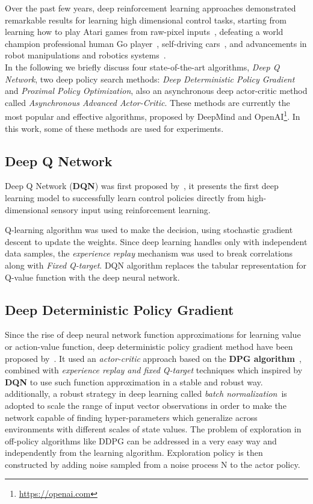 Over the past few years, deep reinforcement learning approaches demonstrated remarkable results for learning high dimensional control tasks, starting from learning how to play Atari games from raw-pixel inputs~\parencite{mnih2015human, mnih2016asynchronous}, defeating a world champion professional human Go player~\parencite{silver2016mastering}, self-driving cars~\parencite{wang2018deep}, and advancements in robot manipulations and robotics systems~\parencite{45926, singh2019end}.\\

In the following we briefly discuss four state-of-the-art algorithms, \textit{Deep Q Network}, two deep policy search methods: \textit{Deep Deterministic Policy Gradient} and \textit{Proximal Policy Optimization}, also an asynchronous deep actor-critic method called \textit{Asynchronous Advanced Actor-Critic}.
These methods are currently the most popular and effective algorithms, proposed by DeepMind and OpenAI\footnote{\url{https://openai.com}}. In this work, some of these methods are used for experiments.

\subsection{Deep Q Network}
Deep Q Network (\textbf{DQN}) was first proposed by~\parencite{mnih2013playing}, it presents the first deep learning model to successfully learn control policies directly from high-dimensional sensory input using reinforcement learning.

Q-learning algorithm was used to make the decision, using stochastic gradient descent to update the weights. Since deep learning handles only with independent data samples, the \textit{experience replay} mechanism was used to break correlations along with \textit{Fixed Q-target}. DQN algorithm replaces the tabular representation for Q-value function with the deep neural network.

\subsection{Deep Deterministic Policy Gradient}
Since the rise of deep neural network function approximations for learning value or action-value function, deep deterministic policy gradient method have been proposed by~\parencite{lillicrap2015continuous}. It used an \textit{actor-critic} approach based on the \textbf{DPG algorithm}~\parencite{silver2014deterministic}, combined with \textit{experience replay and fixed Q-target} techniques which inspired by \textbf{DQN} to use such function approximation in a stable and robust way. additionally, a robust strategy in deep learning called \textit{batch normalization}~\parencite{ioffe2015batch}is  adopted to scale the range of input vector observations in order to make the network capable of finding hyper-parameters which generalize across environments with different scales of state values.
The problem of exploration in off-policy algorithms like DDPG can be addressed in a very easy way and independently from the learning algorithm. Exploration policy is then constructed by adding noise sampled from a noise process N to the actor policy.

